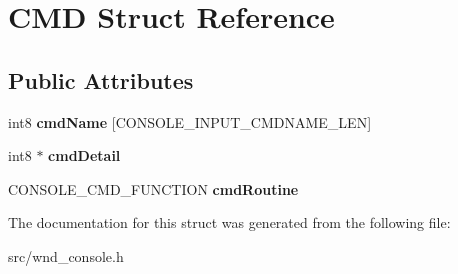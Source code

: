 \hypertarget{struct_c_m_d}{}\section{C\+M\+D Struct Reference}
\label{struct_c_m_d}
\subsection*{Public Attributes}
\begin{DoxyCompactItemize}
\item 
\hypertarget{struct_c_m_d_ac46e95be0c31a3f3a37113124475b4ed}{}int8 {\bfseries cmd\+Name} \mbox{[}C\+O\+N\+S\+O\+L\+E\+\_\+\+I\+N\+P\+U\+T\+\_\+\+C\+M\+D\+N\+A\+M\+E\+\_\+\+L\+E\+N\mbox{]}\label{struct_c_m_d_ac46e95be0c31a3f3a37113124475b4ed}

\item 
\hypertarget{struct_c_m_d_a7e45a13751df6f61244abcdd8361d5c6}{}int8 $\ast$ {\bfseries cmd\+Detail}\label{struct_c_m_d_a7e45a13751df6f61244abcdd8361d5c6}

\item 
\hypertarget{struct_c_m_d_aebf764552f879117331d8505941b5355}{}C\+O\+N\+S\+O\+L\+E\+\_\+\+C\+M\+D\+\_\+\+F\+U\+N\+C\+T\+I\+O\+N {\bfseries cmd\+Routine}\label{struct_c_m_d_aebf764552f879117331d8505941b5355}

\end{DoxyCompactItemize}


The documentation for this struct was generated from the following file\+:\begin{DoxyCompactItemize}
\item 
src/wnd\+\_\+console.\+h\end{DoxyCompactItemize}
